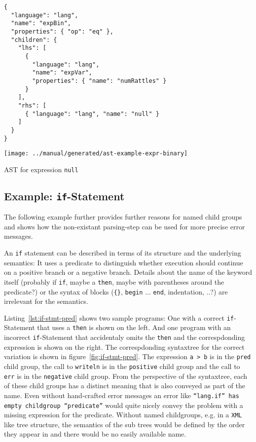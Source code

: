 \documentclass[sigconf,natbib=false,review=true,anonymous]{acmart}
\newcommand\astScale{0.75}
\begin{document}
\begin{listing}[H]
\begin{verbatim}
{
  "language": "lang",
  "name": "expBin",
  "properties": { "op": "eq" },
  "children": {
    "lhs": [
      {
        "language": "lang",
        "name": "expVar",
        "properties": { "name": "numRattles" }
      }
    ],
    "rhs": [
      { "language": "lang", "name": "null" }
    ]
  }
}
\end{verbatim}
\texttt{[image: ../manual/generated/ast-example-expr-binary]}
\caption{AST for expression \texttt{null}}
\label{lst:ast-expr-binary}
\end{listing}

\subsection{Example: \texttt{if}-Statement}

The following example further provides further reasons for named child groups and shows how the non-existant parsing-step can be used for more precise error messages.

An \texttt{if} statement can be described in terms of its structure and the underlying semantics: It uses a predicate to distinguish whether execution should continue on a positive branch or a negative branch. Details about the name of the keyword itself (probably if \texttt{if}, maybe a \texttt{then}, maybe with parentheses around the predicate?) or the syntax of blocks (\texttt{\{\}}, \texttt{begin} ... \texttt{end}, indentation, ..?) are irrelevant for the semantics.

Listing~\ref{lst:if-stmt-pred} shows two sample programs: One with a correct \texttt{if}-Statement that uses a \texttt{then} is shown on the left. And one program with an incorrect \texttt{if}-Statement that accidentaly omits the \texttt{then} and the correspdonding expression is shown on the right. The correspdonding syntaxtree for the correct variation is shown in figure~\ref{fig:if-stmt-pred}. The expression \texttt{a > b} is in the \texttt{pred} child group, the call to \texttt{writeln} is in the \texttt{positive} child group and the call to \texttt{err} is in the \texttt{negative} child group. From the perspective of the syntaxtree, each of these child groups has a distinct meaning that is also conveyed as part of the name. Even without hand-crafted error messages an error like \texttt{\enquote{lang.if} has empty childgroup \enquote{predicate}} would quite nicely convey the problem with a missing expression for the predicate. Without named childgroups, e.g. in a \texttt{XML} like tree structure, the semantics of the sub trees would be defined by the order they appear in and there would be no easily available name.
\end{document}

